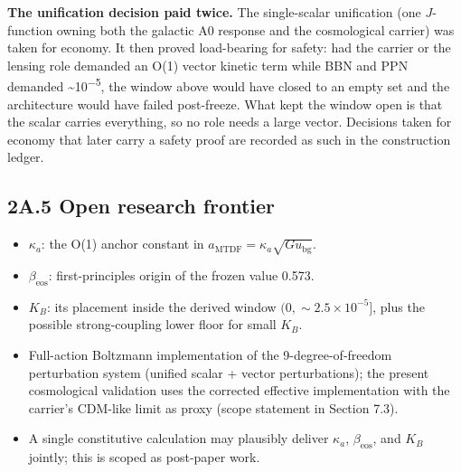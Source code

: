 \documentclass[11pt,a4paper]{article}
\begin{document}
\textbf{The unification decision paid twice.} The single-scalar unification (one \(J\)-function owning both the galactic A0 response and the cosmological carrier) was taken for economy. It then proved load-bearing for safety: had the carrier or the lensing role demanded an O(1) vector kinetic term while BBN and PPN demanded \~{}10\textsuperscript{$-$5}, the window above would have closed to an empty set and the architecture would have failed post-freeze. What kept the window open is that the scalar carries everything, so no role needs a large vector. Decisions taken for economy that later carry a safety proof are recorded as such in the construction ledger.

\subsection*{2A.5 Open research frontier}
\begin{itemize}
  \item \(\kappa_a\): the O(1) anchor constant in \(a_{\mathrm{MTDF}} = \kappa_a\sqrt{G u_{\mathrm{bg}}}\).
  \item \(\beta_{\mathrm{eos}}\): first-principles origin of the frozen value 0.573.
  \item \(K_B\): its placement inside the derived window \((0, \sim 2.5\times10^{-5}]\), plus the possible strong-coupling lower floor for small \(K_B\).
  \item Full-action Boltzmann implementation of the 9-degree-of-freedom perturbation system (unified scalar + vector perturbations); the present cosmological validation uses the corrected effective implementation with the carrier's CDM-like limit as proxy (scope statement in Section 7.3).
  \item A single constitutive calculation may plausibly deliver \(\kappa_a\), \(\beta_{\mathrm{eos}}\), and \(K_B\) jointly; this is scoped as post-paper work.
\end{itemize}
\end{document}

